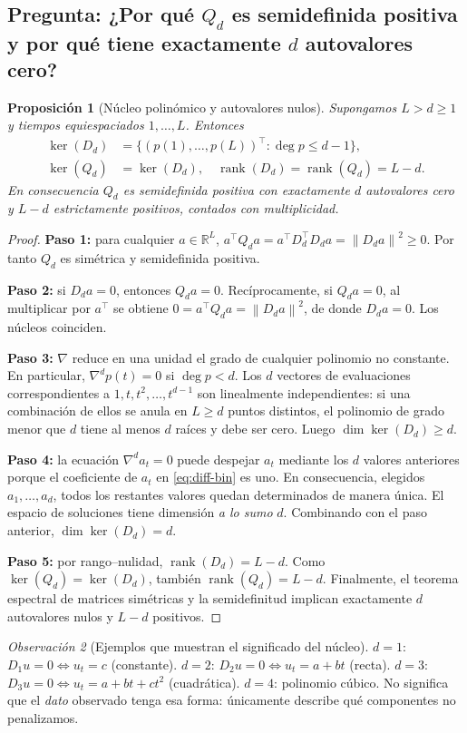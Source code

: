 \documentclass[11pt,letterpaper,parskip=half,headings=small]{scrartcl}
\newtheorem{proposicion}{Proposición}[section]
\theoremstyle{definition}\newtheorem{definicion}[proposicion]{Definición}
\theoremstyle{remark}\newtheorem{observacion}[proposicion]{Observación}
\newcommand{\R}{\mathbb R}\newcommand{\EE}{\mathbb E}\newcommand{\Var}{\operatorname{Var}}
\newcommand{\rank}{\operatorname{rank}}\newcommand{\nul}{\operatorname{ker}}
\newcommand{\norm}[1]{\left\lVert#1\right\rVert}\newcommand{\inner}[2]{\left\langle#1,#2\right\rangle}
\newcommand{\pregunta}[1]{\subsection{Pregunta: #1}}
\begin{document}
\pregunta{¿Por qué $Q_d$ es semidefinida positiva y por qué tiene exactamente $d$ autovalores cero?}
\begin{proposicion}[Núcleo polinómico y autovalores nulos]\label{prop:null}
Supongamos $L>d\geq1$ y tiempos equiespaciados $1,\ldots,L$. Entonces
\begin{align}
\nul(D_d)&=\{(p(1),\ldots,p(L))^\top:\deg p\leq d-1\},\\
\nul(Q_d)&=\nul(D_d),\quad \rank(D_d)=\rank(Q_d)=L-d.
\end{align}
En consecuencia $Q_d$ es semidefinida positiva con \emph{exactamente $d$ autovalores cero} y $L-d$ estrictamente positivos, contados con multiplicidad.
\end{proposicion}
\begin{proof}
\textbf{Paso 1:} para cualquier $a\in\R^L$,
$a^\top Q_da=a^\top D_d^\top D_da=\norm{D_da}^2\geq0$.
Por tanto $Q_d$ es simétrica y semidefinida positiva.

\textbf{Paso 2:} si $D_da=0$, entonces $Q_da=0$. Recíprocamente, si $Q_da=0$, al multiplicar por $a^\top$ se obtiene $0=a^\top Q_da=\norm{D_da}^2$, de donde $D_da=0$. Los núcleos coinciden.

\textbf{Paso 3:} $\nabla$ reduce en una unidad el grado de cualquier polinomio no constante. En particular, $\nabla^dp(t)=0$ si $\deg p<d$. Los $d$ vectores de evaluaciones correspondientes a $1,t,t^2,\ldots,t^{d-1}$ son linealmente independientes: si una combinación de ellos se anula en $L\geq d$ puntos distintos, el polinomio de grado menor que $d$ tiene al menos $d$ raíces y debe ser cero. Luego $\dim\nul(D_d)\geq d$.

\textbf{Paso 4:} la ecuación $\nabla^da_t=0$ puede despejar $a_t$ mediante los $d$ valores anteriores porque el coeficiente de $a_t$ en \eqref{eq:diff-bin} es uno. En consecuencia, elegidos $a_1,\ldots,a_d$, todos los restantes valores quedan determinados de manera única. El espacio de soluciones tiene dimensión \emph{a lo sumo} $d$. Combinando con el paso anterior, $\dim\nul(D_d)=d$.

\textbf{Paso 5:} por rango--nulidad, $\rank(D_d)=L-d$. Como $\nul(Q_d)=\nul(D_d)$, también $\rank(Q_d)=L-d$. Finalmente, el teorema espectral de matrices simétricas y la semidefinitud implican exactamente $d$ autovalores nulos y $L-d$ positivos.
\end{proof}

\begin{observacion}[Ejemplos que muestran el significado del núcleo]
$d=1$: $D_1u=0\iff u_t=c$ (constante). $d=2$: $D_2u=0\iff u_t=a+bt$ (recta). $d=3$: $D_3u=0\iff u_t=a+bt+ct^2$ (cuadrática). $d=4$: polinomio cúbico. No significa que el \emph{dato} observado tenga esa forma: únicamente describe qué componentes no penalizamos.
\end{observacion}
\end{document}
